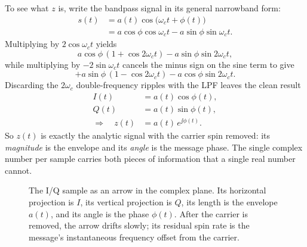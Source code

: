 To see what $z$ is, write the bandpass signal in its general narrowband form:
\begin{align*}
s(t) &= a(t)\cos\!\big(\omega_c t + \phi(t)\big) \\
&= a\cos\phi\cos\omega_c t - a\sin\phi\sin\omega_c t.
\end{align*}
Multiplying by $2\cos\omega_c t$ yields
\[
a\cos\phi\,(1+\cos 2\omega_c t) - a\sin\phi\sin 2\omega_c t,
\]
while multiplying by $-2\sin\omega_c t$ cancels the minus sign on the sine term to give
\[
+a\sin\phi\,(1-\cos 2\omega_c t) - a\cos\phi\sin 2\omega_c t.
\]
Discarding the $2\omega_c$ double-frequency ripples with the LPF leaves the clean result
\begin{equation}
\label{ch23:iq-result}
\begin{aligned}
I(t) &= a(t)\cos\phi(t), \\
Q(t) &= a(t)\sin\phi(t), \\
\Longrightarrow\quad z(t) &= a(t)\,e^{\jj\phi(t)}.
\end{aligned}
\end{equation}
So $z(t)$ is exactly the analytic signal with the carrier spin removed: its
\emph{magnitude} is the envelope and its \emph{angle} is the message phase. The single
complex number per sample carries both pieces of information that a single real number
cannot.

\begin{figure}[H]
\centering
{}
\caption{The I/Q sample as an arrow in the complex plane. Its horizontal projection is
$I$, its vertical projection is $Q$, its length is the envelope $a(t)$, and its angle is
the phase $\phi(t)$. After the carrier is removed, the arrow drifts slowly; its residual
spin rate is the message's instantaneous frequency offset from the carrier.}
\label{ch23:fig-iqplane}
\end{figure}

